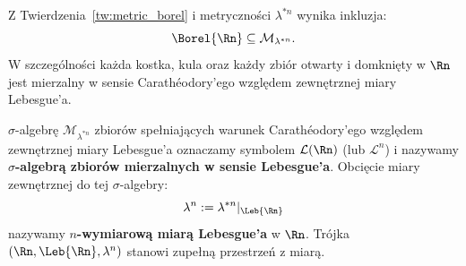 \begin{wn} Z Twierdzenia~\ref{tw:metric_borel} i metryczności $\lambda^{*n}$ wynika inkluzja:
    \begin{equation*}
        \Borel{\Rn} \subseteq \mathcal{M}_{\lambda^{*n}}.
    \end{equation*}
    W szczególności każda kostka, kula oraz każdy zbiór otwarty i domknięty w $\Rn$ jest mierzalny w sensie Carathéodory'ego względem zewnętrznej miary Lebesgue'a.
\end{wn}
\begin{defi}
    $\sigma$-algebrę $\mathcal{M}_{\lambda^{*n}}$ zbiorów spełniających warunek Carathéodory'ego względem zewnętrznej miary Lebesgue'a oznaczamy symbolem $\mathcal{L}(\Rn)$ (lub $\mathcal{L}^n$) i nazywamy \textbf{$\sigma$-algebrą zbiorów mierzalnych w sensie Lebesgue'a}. Obcięcie miary zewnętrznej do tej $\sigma$-algebry:
    \begin{equation*}
        \lambda^n := \lambda^{*n}|_{\Leb{\Rn}}
    \end{equation*}
    nazywamy \textbf{$n$-wymiarową miarą Lebesgue'a} w $\Rn$. Trójka $(\Rn, \Leb{\Rn}, \lambda^n)$ stanowi zupełną przestrzeń z miarą.
\end{defi}
